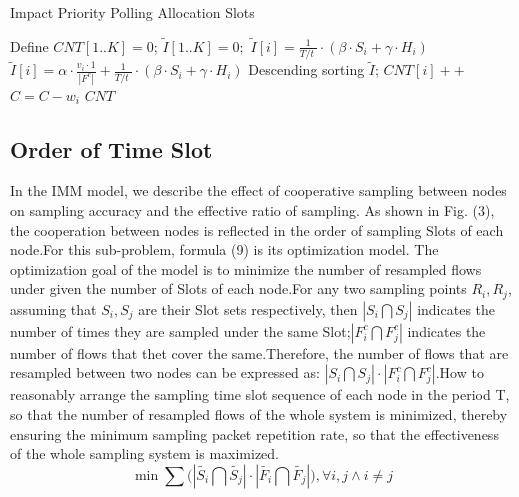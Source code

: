\documentclass[conference,compsoc]{IEEEtran}
\begin{document}
\begin{algorithm}[h]
\caption{Impact Priority Polling Allocation Slots}
\begin{algorithmic}[1]
\STATE Define $CNT[1..K] = 0$;   $\widetilde{I}[1..K] = 0;$
\STATE  $ \widetilde{I}[i]  = \frac{1}{{T}/{t}\;}\cdot (\beta \cdot {{S}_{i}}+\gamma \cdot {{H}_{i}})$ 
\ELSE 
\STATE  $ \widetilde{I}[i]  = \alpha \cdot \frac{{{v}_{i}\cdot 1}}{\left| {{F}^{c}} \right|}+\frac{1}{{T}/{t}\;} \cdot (\beta \cdot {{S}_{i}}+\gamma \cdot {{H}_{i}})$
\ENDIF
\ENDFOR
\STATE Descending sorting $ \widetilde{I}  $;
\STATE $CNT[i]++$
\STATE $C = C - w_i $
\ENDIF
\ENDFOR
\ENDWHILE
\RETURN $CNT$
\label{code:recentEnd}
\end{algorithmic}
\end{algorithm}


\subsection{Order of Time Slot}
In the IMM model, we describe the effect of cooperative sampling between nodes on sampling accuracy and the effective ratio of sampling. As shown in Fig. (3), the cooperation between nodes is reflected in the order of sampling Slots of each node.For this sub-problem, formula (9) is its optimization model. The optimization goal of the model is to minimize the number of resampled flows under given the number of Slots of each node.For any two sampling points $R_i, R_j$, assuming that $S_i, S_j$ are their Slot sets respectively, then $|S_i \bigcap S_j|$ indicates the number of times they are sampled under the same Slot;$|F_i^c \bigcap F_j^c|$ indicates the number of flows that thet cover the same.Therefore, the number of flows that are resampled between two nodes can be expressed as: $|S_i \bigcap S_j| \cdot |F_i^c \bigcap F_j^c|$.How to reasonably arrange the sampling time slot sequence of each node in the period T, so that the number of resampled flows of the whole system is minimized, thereby ensuring the minimum sampling packet repetition rate, so that the effectiveness of the whole sampling system is maximized.
\begin{equation}
\min \sum{(\left| \widetilde{{{S}_{i}}}\bigcap \widetilde{{{S}_{j}}} \right|}\cdot \left| \widetilde{{{F}_{i}}}\bigcap \widetilde{{{F}_{j}}} \right|),\forall i,j\wedge i\ne j
\end{equation}
\end{document}
